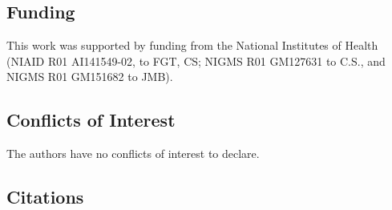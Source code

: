 \documentclass[
  letterpaper,
  DIV=11,
  numbers=noendperiod]{scrartcl}
\begin{document}
\subsection{Funding}\label{funding}

This work was supported by funding from the National Institutes of
Health (NIAID R01 AI141549-02, to FGT, CS; NIGMS R01 GM127631 to C.S.,
and NIGMS R01 GM151682 to JMB).

\subsection{Conflicts of Interest}\label{conflicts-of-interest}

The authors have no conflicts of interest to declare.

\subsection{Citations}\label{citations}
\end{document}
